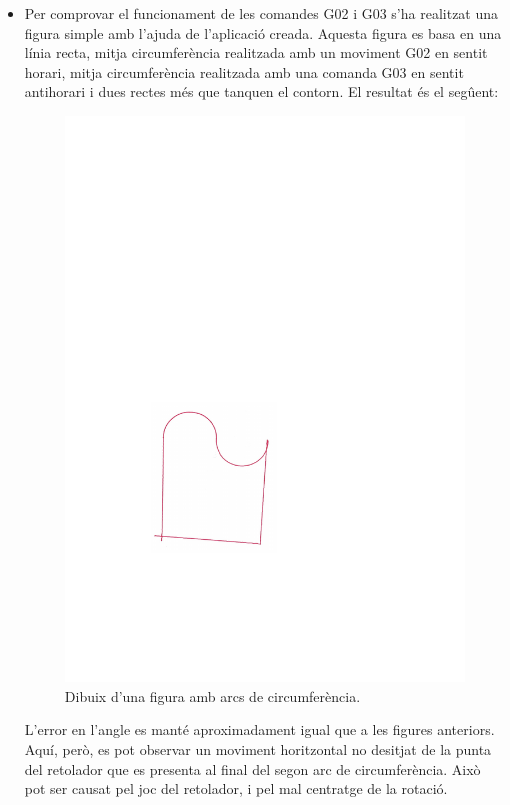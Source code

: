 \begin{itemize}
	\item Per comprovar el funcionament de les comandes G02 i G03 s'ha realitzat una figura simple amb l'ajuda de l'aplicació creada. Aquesta figura es basa en una línia recta, mitja circumferència realitzada amb un moviment G02 en sentit horari, mitja circumferència realitzada amb una comanda G03 en sentit antihorari i dues rectes més que tanquen el contorn. El resultat és el segûent:
	\begin{figure}[H]
		\centering
		\includegraphics{resultatFuncionara}
		\caption{Dibuix d'una figura amb arcs de circumferència.}
		\label{fig:funcionara}
	\end{figure}	
	L'error en l'angle es manté aproximadament igual que a les figures anteriors. Aquí, però, es pot observar un moviment horitzontal no desitjat de la punta del retolador que es presenta al final del segon arc de circumferència. Això pot ser causat pel joc del retolador, i pel mal centratge de la rotació.
	

\end{itemize}
